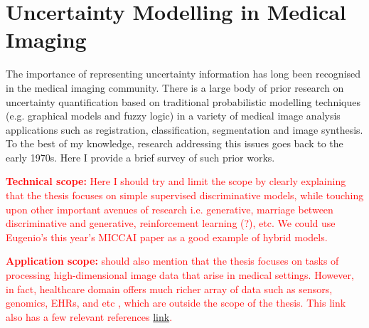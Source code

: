 %




\section{Uncertainty Modelling in Medical Imaging}
The importance of representing uncertainty information has long been recognised in the medical imaging community. There is a large body of prior research on uncertainty quantification based on traditional probabilistic modelling techniques (e.g. graphical models and fuzzy logic) in a variety of medical image analysis applications such as registration, classification, segmentation and image synthesis. To the best of my knowledge, research addressing this issues goes back to the early 1970s. Here I provide a brief survey of such prior works.	

\textcolor{red}{\textbf{Technical scope:} Here I should try and limit the scope by clearly explaining that the thesis focuses on simple supervised discriminative models, while touching upon other important avenues of research i.e.  generative, marriage between discriminative and generative, reinforcement learning (?), etc. We could use Eugenio's this year's MICCAI paper as a good example of hybrid models. }

\textcolor{red}{\textbf{Application scope:}  should also mention that the thesis focuses on tasks of processing high-dimensional image data that arise in medical settings. However, in fact, healthcare domain offers much richer array of data such as sensors, genomics, EHRs, and etc \cite{esteva2019guide}, which are outside the scope of the thesis. This link also has a few relevant references \href{https://www.mckinsey.com/industries/pharmaceuticals-and-medical-products/our-insights/machine-learning-and-therapeutics-2-0-avoiding-hype-realizing-potential}{link}.}


